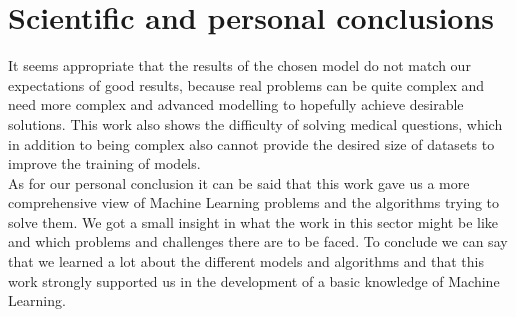\section{Scientific and personal conclusions}
It seems appropriate that the results of the chosen model do not match our expectations of good results, because real problems can be quite complex and need more complex and advanced modelling to hopefully achieve desirable solutions. This work also shows the difficulty of solving medical questions, which in addition to being complex also cannot provide the desired size of datasets to improve the training of models.\\
As for our personal conclusion it can be said that this work gave us a more comprehensive view of Machine Learning problems and the algorithms trying to solve them. We got a small insight in what the work in this sector might be like and which problems and challenges there are to be faced. To conclude we can say that we learned a lot about the different models and algorithms and that this work strongly supported us in the development of a basic knowledge of Machine Learning.